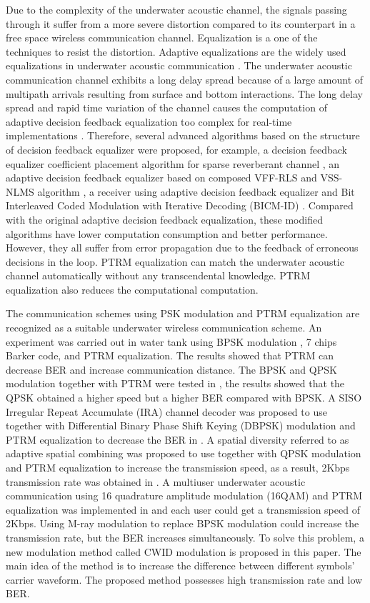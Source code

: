 \documentclass[journal]{IEEEtran}
\begin{document}
Due to the complexity of the underwater acoustic channel, the
signals passing through it suffer from a more severe distortion
compared to its counterpart in a free space wireless communication
channel. Equalization is a one of the techniques to resist the
distortion. Adaptive equalizations are the widely used equalizations
in underwater acoustic communication
\cite{Stojanovic1993,Rouseff2001,Yin2008,Vadde2011}. The underwater
acoustic communication channel exhibits a long delay spread because
of a large amount of multipath arrivals resulting from surface and
bottom interactions. The long delay spread and rapid time variation
of the channel causes the computation of adaptive decision feedback
equalization too complex for real-time implementations
\cite{Shahabudeen2008}. Therefore, several advanced algorithms based
on the structure of decision feedback equalizer were proposed, for
example, a decision feedback equalizer coefficient placement
algorithm for sparse reverberant channel \cite{Lopez2001}, an
adaptive decision feedback equalizer based on composed VFF-RLS and
VSS-NLMS algorithm \cite{Zhao2010}, a receiver using adaptive
decision feedback equalizer and Bit Interleaved Coded Modulation
with Iterative Decoding (BICM-ID) \cite{Shah2011}. Compared with the
original adaptive decision feedback equalization, these modified
algorithms have lower computation consumption and better
performance. However, they all suffer from error propagation due to
the feedback of erroneous decisions in the loop. PTRM equalization
can match the underwater acoustic channel automatically without any
transcendental knowledge. PTRM equalization also reduces the
computational computation.

The communication schemes using PSK modulation and PTRM equalization
are recognized as a suitable underwater wireless communication
scheme. An experiment was carried out in water tank using BPSK
modulation \cite{Lu2005}, 7 chips Barker code, and PTRM
equalization. The results showed that PTRM can decrease BER and
increase communication distance. The BPSK and QPSK modulation
together with PTRM were tested in \cite{Edelmann2005}, the results
showed that the QPSK obtained a higher speed but a higher BER
compared with BPSK. A SISO Irregular Repeat Accumulate (IRA) channel
decoder was proposed to use together with Differential Binary Phase
Shift Keying (DBPSK) modulation and PTRM equalization to decrease
the BER in \cite{Keeser2009}. A spatial diversity referred to as
adaptive spatial combining was proposed to use together with QPSK
modulation and PTRM equalization to increase the transmission speed,
as a result, 2Kbps transmission rate was obtained in
\cite{Zhang2011}. A multiuser underwater acoustic communication
using 16 quadrature amplitude modulation (16QAM) and PTRM
equalization was implemented in \cite{Song2010} and each user could
get a transmission speed of 2Kbps. Using M-ray modulation to replace
BPSK modulation could increase the transmission rate, but the BER
increases simultaneously. To solve this problem, a new modulation
method called CWID modulation is proposed in this paper. The main
idea of the method is to increase the difference between different
symbols' carrier waveform. The proposed method possesses high
transmission rate and low BER.
\end{document}
